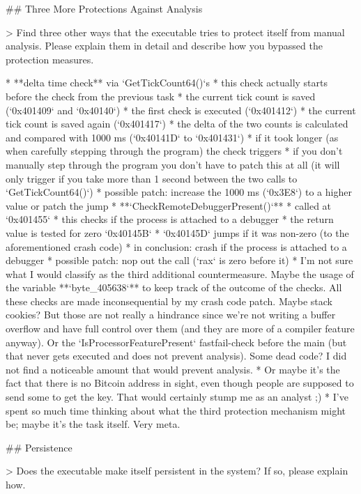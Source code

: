 \begin{markdown}

## Three More Protections Against Analysis

> \noindent Find three other ways that the executable tries to protect itself from manual analysis. Please explain them in detail and describe how you bypassed the protection measures.

* **delta time check** via `GetTickCount64()`s
    * this check actually starts before the check from the previous task
        * the current tick count is saved (`0x401409` and `0x40140`)
        * the first check is executed (`0x401412`)
        * the current tick count is saved again (`0x401417`)
        * the delta of the two counts is calculated and compared with 1000 ms (`0x40141D` to `0x401431`)
    * if it took longer (as when carefully stepping through the program) the check triggers
    * if you don't manually step through the program you don't have to patch this at all (it will only trigger if you take more than 1 second between the two calls to `GetTickCount64()`)
    * possible patch: increase the 1000 ms (`0x3E8`) to a higher value or patch the jump
* **`CheckRemoteDebuggerPresent()`**
    * called at `0x401455`
    * this checks if the process is attached to a debugger
    * the return value is tested for zero `0x40145B`
    * `0x40145D` jumps if it was non-zero (to the aforementioned crash code)
    * in conclusion: crash if the process is attached to a debugger
    * possible patch: nop out the call (`rax` is zero before it)
* I'm not sure what I would classify as the third additional countermeasure. Maybe the usage of the variable **`byte_405638`** to keep track of the outcome of the checks. All these checks are made inconsequential by my crash code patch.
Maybe stack cookies? But those are not really a hindrance since we're not writing a buffer overflow and have full control over them (and they are more of a compiler feature anyway). 
Or the `IsProcessorFeaturePresent` fastfail-check before the main (but that never gets executed and does not prevent analysis). Some dead code? I did not find a noticeable amount that would prevent analysis.
* Or maybe it's the fact that there is no Bitcoin address in sight, even though people are supposed to send some to get the key. That would certainly stump me as an analyst ;)
* I've spent so much time thinking about what the third protection mechanism might be; maybe it's the task itself. Very meta.

## Persistence

> \noindent Does the executable make itself persistent in the system? If so, please explain how.


\end{markdown}
